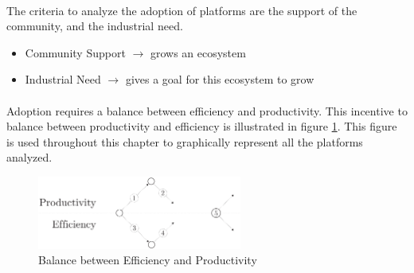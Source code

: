 \paragraph{}

The criteria to analyze the adoption of platforms are the support of the community, and the industrial need.

\begin{itemize}
\item Community Support
  \subitem $\to$ grows an ecosystem
\item Industrial Need
  \subitem $\to$ gives a goal for this ecosystem to grow
\end{itemize}

\paragraph{}

Adoption requires a balance between efficiency and productivity.
This incentive to balance between productivity and efficiency is illustrated in figure \ref{fig:state-of-the-art}.
This figure is used throughout this chapter to graphically represent all the platforms analyzed.

\begin{figure}[h!]
\begin{center}
\includegraphics[width=0.6\textwidth]{../resources/state-of-the-art.pdf}
\end{center}
\caption{Balance between Efficiency and Productivity}
\label{fig:state-of-the-art}
\end{figure}








